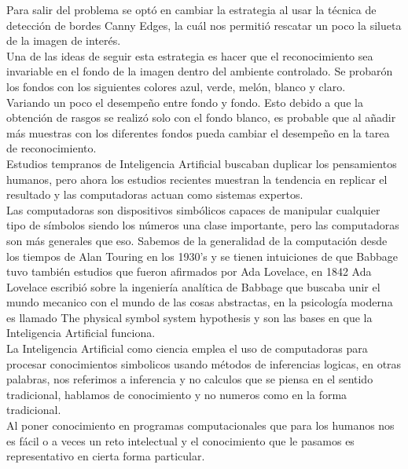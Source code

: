 \documentclass[a4paper, 11pt]{article}
\begin{document}
Para salir del problema se optó en cambiar la estrategia al usar la técnica de detección de bordes Canny Edges, la cuál nos permitió rescatar un poco la silueta de la imagen de interés.\\

Una de las ideas de seguir esta estrategia es hacer que el reconocimiento sea invariable en el fondo de la imagen dentro del ambiente controlado. Se probarón los fondos con los siguientes colores azul, verde, melón, blanco y claro.\\

Variando un poco el desempeño entre fondo y fondo. Esto debido a que la obtención de rasgos se realizó solo con el fondo blanco, es probable que al añadir más muestras con los diferentes fondos pueda cambiar el desempeño en la tarea de reconocimiento.\\

Estudios tempranos de Inteligencia Artificial buscaban duplicar los pensamientos humanos, pero ahora los estudios recientes muestran la tendencia en replicar el resultado y las computadoras actuan como sistemas expertos.\\

Las computadoras son dispositivos simbólicos capaces de manipular cualquier tipo de símbolos siendo los números una clase importante, pero las computadoras son más generales que eso. Sabemos de la generalidad de la computación desde los tiempos de Alan Touring en los 1930's y se tienen intuiciones de que Babbage tuvo también estudios que fueron afirmados por Ada Lovelace, en 1842 Ada Lovelace escribió sobre la ingeniería analítica de Babbage que buscaba unir el mundo mecanico con el mundo de las cosas abstractas, en la psicología moderna es llamado The physical symbol system hypothesis y son las bases en que la Inteligencia Artificial funciona.\\

La Inteligencia Artificial como ciencia emplea el uso de computadoras para procesar conocimientos simbolicos usando métodos de inferencias logicas, en otras palabras, nos referimos a inferencia y no calculos que se piensa en el sentido tradicional, hablamos de conocimiento y no numeros como en la forma tradicional. \cite{youtube}\\
Al poner conocimiento en programas computacionales que para los humanos nos es fácil o a veces un reto intelectual y el conocimiento que le pasamos es representativo en cierta forma particular.\\
\end{document}
